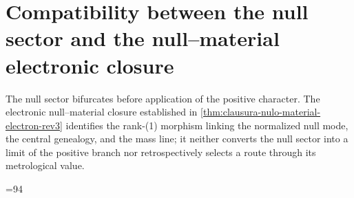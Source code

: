 

\section{Compatibility between the null sector and the null--material electronic closure}
The null sector bifurcates before application of the positive character. The
electronic null--material closure established in
\cref{thm:clausura-nulo-material-electron-rev3} identifies the rank-(1)
morphism linking the normalized null mode, the central genealogy, and the
mass line; it neither converts the null sector into a limit of the positive
branch nor retrospectively selects a route through its metrological value.





\makeatletter
\ifHMTPartIVElectronOwnersInserted\else
  \PackageError{hmt-sucesor-102}{The electronic owners 06ka/06l were not activated}{Part IV cannot be closed without their complete bodies.}%
\fi
\ifnum\value{chapter}=94\relax
\else
  \PackageError{hmt-sucesor-102}{Part IV does not end at chapter 94}{Review the correspondence 56--90 to 58--92, new 93, and 91 to 94.}%
\fi
\let\chapter\HMTPartIVPublicChapter
\makeatother










\HMTFlushCurrentChapter
